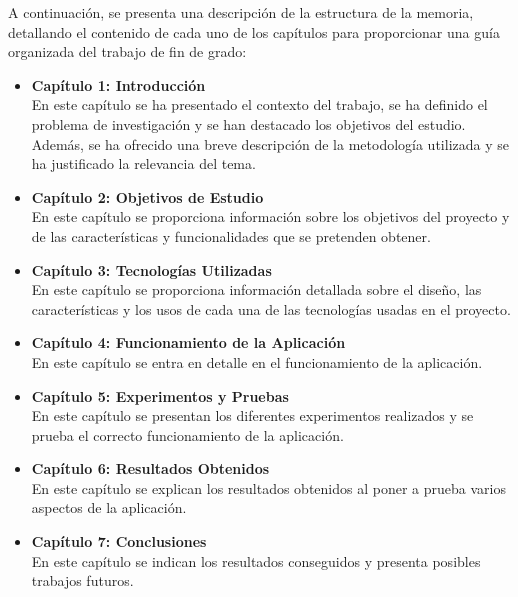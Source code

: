 \documentclass[a4paper, 12pt]{book}
\begin{document}
A continuación, se presenta una descripción de la estructura de la memoria, detallando el contenido de cada uno de los capítulos para 
proporcionar una guía organizada del trabajo de fin de grado:

\begin{itemize}
  \item \textbf{Capítulo 1: Introducción} \\
  En este capítulo se ha presentado el contexto del trabajo, se ha definido el problema de investigación y se han destacado los objetivos del estudio. Además, se ha ofrecido una breve descripción de la metodología utilizada y se ha justificado la relevancia del tema.
  \item \textbf{Capítulo 2: Objetivos de Estudio} \\
  En este capítulo se proporciona información sobre los objetivos del proyecto y de las características y funcionalidades que se pretenden obtener.  
  \item \textbf{Capítulo 3: Tecnologías Utilizadas} \\
  En este capítulo se proporciona información detallada sobre el diseño, las características y los usos de cada una de las tecnologías usadas en el proyecto.
  \item \textbf{Capítulo 4: Funcionamiento de la Aplicación} \\
  En este capítulo se entra en detalle en el funcionamiento de la aplicación.
  \item \textbf{Capítulo 5: Experimentos y Pruebas} \\
  En este capítulo se presentan los diferentes experimentos realizados y se prueba el correcto funcionamiento de la aplicación.
  \item \textbf{Capítulo 6: Resultados Obtenidos} \\
  En este capítulo se explican los resultados obtenidos al poner a prueba varios aspectos de la aplicación.
  \item \textbf{Capítulo 7: Conclusiones} \\
  En este capítulo se indican los resultados conseguidos y presenta posibles trabajos futuros.
\end{itemize}

\end{document}
